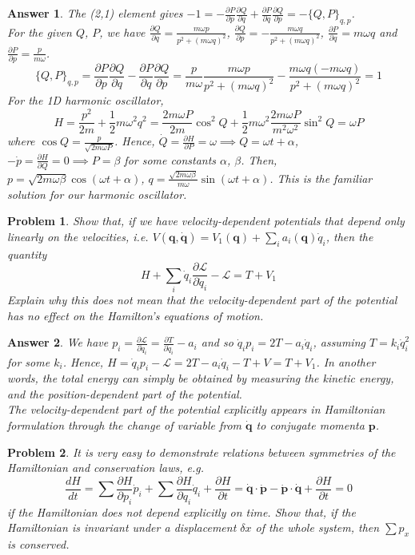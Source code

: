 \documentclass[a4paper]{article}
\newtheorem{ans}{Answer}[subsection]
\theoremstyle{new}
\newtheorem{qns}{Problem}[section]
\begin{document}
\begin{ans}
The (2,1) element gives $-1=-\frac{\partial P}{\partial p}\frac{\partial Q}{\partial q}+\frac{\partial P}{\partial q}\frac{\partial Q}{\partial p}=-\{Q,P\}_{q,p}$.\\[5pt]
For the given $Q$, $P$, we have $\frac{\partial Q}{\partial q}=\frac{m\omega p}{p^2+(m\omega q)^2}$, $\frac{\partial Q}{\partial p}=-\frac{m\omega q}{p^2+(m\omega q)^2}$, $\frac{\partial P}{\partial q}=m\omega q$ and $\frac{\partial P}{\partial p}=\frac{p}{m\omega}$.
$$\{Q,P\}_{q,p}=\frac{\partial P}{\partial p}\frac{\partial Q}{\partial q}-\frac{\partial P}{\partial q}\frac{\partial Q}{\partial p}=\frac{p}{m\omega}\frac{m\omega p}{p^2+(m\omega q)^2}-\frac{m\omega q(-m\omega q)}{p^2+(m\omega q)^2}=1$$
For the 1D harmonic oscillator,
$$H=\frac{p^2}{2m}+\frac{1}{2}m\omega^2q^2=\frac{2m\omega P}{2m}\cos^2Q+\frac{1}{2}m\omega^2\frac{2m\omega P}{m^2\omega^2}\sin^2Q=\omega P$$
where $\cos Q=\frac{p}{\sqrt{2m\omega P}}$. Hence, $\dot{Q}=\frac{\partial H}{\partial P}=\omega\implies Q=\omega t+\alpha$, $-\dot{p}=\frac{\partial H}{\partial Q}=0\implies P=\beta$ for some constants $\alpha$, $\beta$. Then, $p=\sqrt{2m\omega\beta}\cos(\omega t+\alpha)$, $q=\frac{\sqrt{2m\omega\beta}}{m\omega}\sin(\omega t+\alpha)$. This is the familiar solution for our harmonic oscillator.
\end{ans}
\newpage
\begin{qns}
Show that, if we have velocity-dependent potentials that depend only linearly on the velocities, i.e. $V(\mathbf{q},\mathbf{\dot{q}})=V_1(\mathbf{q})+\sum_ia_i(\mathbf{q})\dot{q}_i$, then the quantity
$$H+\sum_i\dot{q}_i\frac{\partial\mathcal{L}}{\partial\dot{q}_i}-\mathcal{L}=T+V_1$$
Explain why this does not mean that the velocity-dependent part of the potential has no effect on the Hamilton's equations of motion.
\end{qns}
\begin{ans}
We have $p_i=\frac{\partial\mathcal{L}}{\partial\dot{q}_i}=\frac{\partial T}{\partial\dot{q}_i}-a_i$ and so $\dot{q}_ip_i=2T-a_i\dot{q}_i$, assuming $T=k_i\dot{q}_i^2$ for some $k_i$. Hence, $H=\dot{q}_ip_i-\mathcal{L}=2T-a_i\dot{q}_i-T+V=T+V_1$. In another words, the total energy can simply be obtained by measuring the kinetic energy, and the position-dependent part of the potential.\\[5pt]
The velocity-dependent part of the potential explicitly appears in Hamiltonian formulation through the change of variable from $\mathbf{\dot{q}}$ to conjugate momenta $\mathbf{p}$.
\end{ans}
\begin{qns}
It is very easy to demonstrate relations between symmetries of the Hamiltonian and conservation laws, e.g.
$$\frac{dH}{dt}=\sum\frac{\partial H}{\partial p_i}\dot{p}_i+\sum\frac{\partial H}{\partial q_i}\dot{q}_i+\frac{\partial H}{\partial t}=\mathbf{\dot{q}}\cdot\mathbf{\dot{p}}-\mathbf{\dot{p}}\cdot\mathbf{\dot{q}}+\frac{\partial H}{\partial t}=0$$
if the Hamiltonian does not depend explicitly on time. Show that, if the Hamiltonian is invariant under a displacement $\delta x$ of the whole system, then $\sum p_x$ is conserved.
\end{qns}
\end{document}
